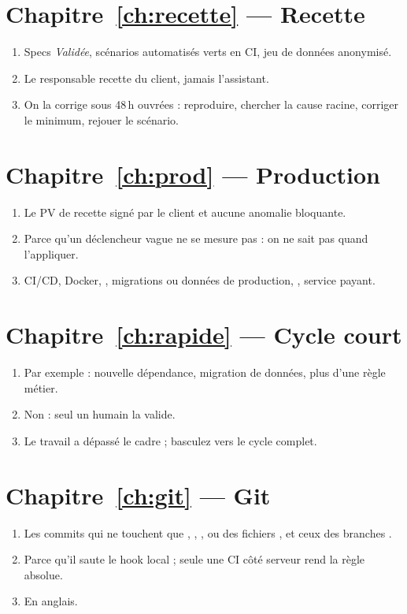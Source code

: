 \section*{Chapitre~\ref{ch:recette} --- Recette}
\begin{enumerate}[label=\sffamily\bfseries\color{leaf}Q\arabic*.,leftmargin=2.2em]
  \item Specs \emph{Validée}, scénarios automatisés verts en CI, jeu de données anonymisé.
  \item Le responsable recette du client, jamais l'assistant.
  \item On la corrige sous 48\,h ouvrées : reproduire, chercher la cause racine, corriger le minimum, rejouer le scénario.
\end{enumerate}
\section*{Chapitre~\ref{ch:prod} --- Production}
\begin{enumerate}[label=\sffamily\bfseries\color{leaf}Q\arabic*.,leftmargin=2.2em]
  \item Le PV de recette signé par le client et aucune anomalie bloquante.
  \item Parce qu'un déclencheur vague ne se mesure pas : on ne sait pas quand l'appliquer.
  \item CI/CD, Docker, , migrations ou données de production, , service payant.
\end{enumerate}
\section*{Chapitre~\ref{ch:rapide} --- Cycle court}
\begin{enumerate}[label=\sffamily\bfseries\color{leaf}Q\arabic*.,leftmargin=2.2em]
  \item Par exemple : nouvelle dépendance, migration de données, plus d'une règle métier.
  \item Non : seul un humain la valide.
  \item Le travail a dépassé le cadre ; basculez vers le cycle complet.
\end{enumerate}
\section*{Chapitre~\ref{ch:git} --- Git}
\begin{enumerate}[label=\sffamily\bfseries\color{leaf}Q\arabic*.,leftmargin=2.2em]
  \item Les commits qui ne touchent que , , ,  ou des fichiers , et ceux des branches .
  \item Parce qu'il saute le hook local ; seule une CI côté serveur rend la règle absolue.
  \item En anglais.
\end{enumerate}
